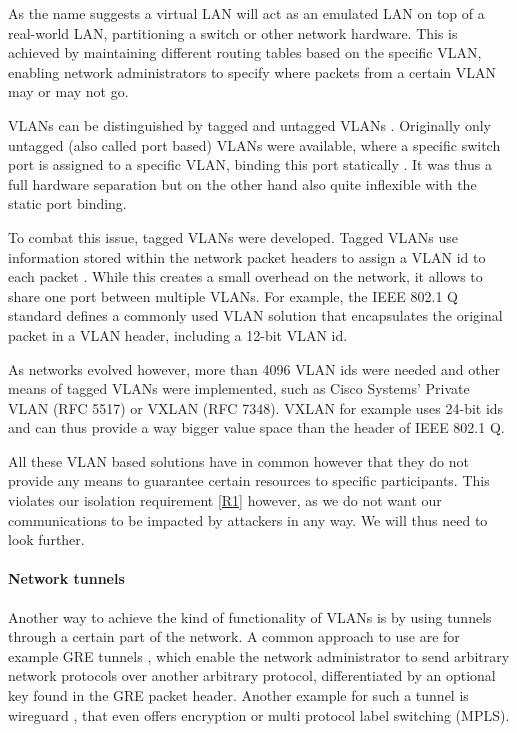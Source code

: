 As the name suggests a virtual LAN will act as an emulated LAN on top of a real-world LAN, partitioning a switch or other network hardware. This is achieved by maintaining different routing tables based on the specific VLAN, enabling network administrators to specify where packets from a certain VLAN may or may not go.

VLANs can be distinguished by tagged and untagged VLANs \cite[25.2]{IEEE8021Q}. Originally only untagged (also called port based) VLANs were available, where a specific switch port is assigned to a specific VLAN, binding this port statically \cite[25.3]{IEEE8021Q}. It was thus a full hardware separation but on the other hand also quite inflexible with the static port binding.

To combat this issue, tagged VLANs were developed. Tagged VLANs use information stored within the network packet headers to assign a VLAN id to each packet \cite{IEEE8021Q}. While this creates a small overhead on the network, it allows to share one port between multiple VLANs. For example, the IEEE 802.1 Q standard defines a commonly used VLAN solution that encapsulates the original packet in a VLAN header, including a 12-bit VLAN id.

As networks evolved however, more than 4096 VLAN ids were needed and other means of tagged VLANs were implemented, such as Cisco Systems' Private VLAN (RFC 5517) \cite{rfc5517} or VXLAN (RFC 7348). VXLAN for example uses 24-bit ids and can thus provide a way bigger value space than the header of IEEE 802.1 Q.

All these VLAN based solutions have in common however that they do not provide any means to guarantee certain resources to specific participants. This violates our isolation requirement \ref{R1} however, as we do not want our communications to be impacted by attackers in any way. We will thus need to look further.

\paragraph{Network tunnels} Another way to achieve the kind of functionality of VLANs is by using tunnels through a certain part of the network. A common approach to use are for example GRE tunnels \cite{rfc2784}, which enable the network administrator to send arbitrary network protocols over another arbitrary protocol, differentiated by an optional key found in the GRE packet header. Another example for such a tunnel is wireguard \cite{wireguard}, that even offers encryption or multi protocol label switching (MPLS).

